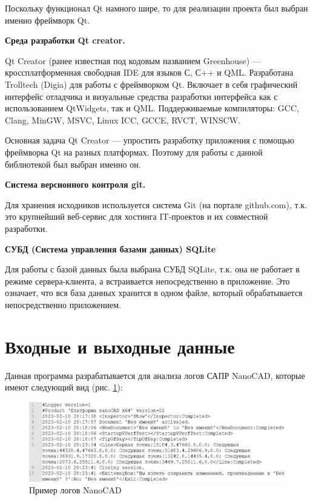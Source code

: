 Поскольку функционал Qt намного шире, то для реализации проекта был выбран именно фреймворк Qt.

\noindent\textbf{Среда разработки Qt creator.}

Qt Creator (ранее известная под кодовым названием Greenhouse) — кроссплатформенная свободная IDE для языков С, С++ и QML. Разработана Trolltech (Digia) для работы с фреймворком Qt. Включает в себя графический интерфейс отладчика и визуальные средства разработки интерфейса как с использованием QtWidgets, так и QML. Поддерживаемые компиляторы: GCC, Clang, MinGW, MSVC, Linux ICC, GCCE, RVCT, WINSCW.

Основная задача Qt Creator — упростить разработку приложения с помощью фреймворка Qt на разных платформах. Поэтому для работы с данной библиотекой был выбран именно он.

\noindent\textbf{Система версионного контроля git.}

Для хранения исходников используется система Git (на портале github.com), т.к. это крупнейший веб-сервис для хостинга IT-проектов и их совместной разработки. %

\noindent\textbf{СУБД (Система управления базами данных) SQLite}

Для работы с базой данных была выбрана СУБД SQLite, т.к. она не работает в режиме сервера-клиента, а встраивается непосредственно в приложение. Это означает, что вся база данных хранится в одном файле, который обрабатывается непосредственно приложением.

\section{Входные и выходные данные}
Данная программа разрабатывается для анализа логов САПР NanoCAD, которые имеют следующий вид (рис. \ref{NanoCAD_logs}):

\begin{figure}[h!] %
	\centering
	\includegraphics[width=1\textwidth]{inc/img/logs2.jpg}
	\caption{Пример логов NanoCAD}
	\label{NanoCAD_logs}
\end{figure}

